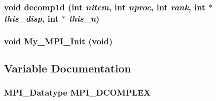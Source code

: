 \subsubsection{\setlength{\rightskip}{0pt plus 5cm}void decomp1d (int {\em nitem}, int {\em nproc}, int {\em rank}, int $\ast$ {\em this\_\-disp}, int $\ast$ {\em this\_\-n})}\label{parautil_8h_a429bcafcf774b5a4b95ac26f6029cb7}


\subsubsection{\setlength{\rightskip}{0pt plus 5cm}void My\_\-MPI\_\-Init (void)}\label{parautil_8h_e9f1b96e2031dddd3261cdd76b6f059e}




\subsection{Variable Documentation}
\subsubsection{\setlength{\rightskip}{0pt plus 5cm}MPI\_\-Datatype {\bf MPI\_\-DCOMPLEX}}\label{parautil_8h_8248504652d3b407b136726772e924c9}


